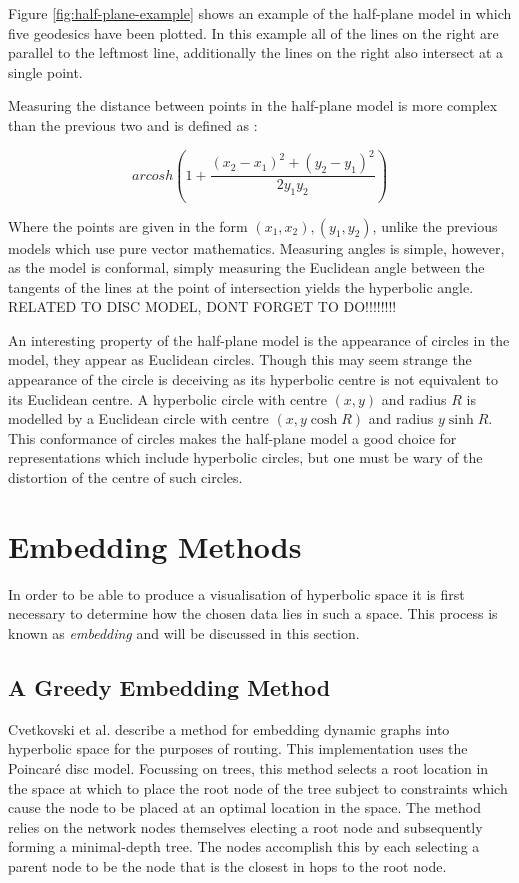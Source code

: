 Figure \ref{fig:half-plane-example} shows an example of the half-plane model in which five geodesics have been plotted. In this example all of the lines on the right are parallel to the leftmost line, additionally the lines on the right also intersect at a single point.

Measuring the distance between points in the half-plane model is more complex than the previous two and is defined as \cite{kubo_geometry_1988}:

\begin{equation}
\label{half_plane_distance}
arcosh\left(1+\frac{(x_2-x_1)^2+(y_2-y_1)^2}{2y_1y_2}\right)
\end{equation}

Where the points are given in the form $(x_1, x_2), (y_1, y_2)$, unlike the previous models which use pure vector mathematics. Measuring angles is simple, however, as the model is conformal, simply measuring the Euclidean angle between the tangents of the lines at the point of intersection yields the hyperbolic angle. RELATED TO DISC MODEL, DONT FORGET TO DO!!!!!!!!

An interesting property of the half-plane model is the appearance of circles in the model, they appear as Euclidean circles. Though this may seem strange the appearance of the circle is deceiving as its hyperbolic centre is not equivalent to its Euclidean centre. A hyperbolic circle with centre $(x,y)$ and radius $R$ is modelled by a Euclidean circle with centre $(x, y \cosh R)$ and radius $y \sinh R$. This conformance of circles makes the half-plane model a good choice for representations which include hyperbolic circles, but one must be wary of the distortion of the centre of such circles.

\section{Embedding Methods}
In order to be able to produce a visualisation of hyperbolic space it is first necessary to determine how the chosen data lies in such a space. This process is known as \textit{embedding} and will be discussed in this section.

\subsection{A Greedy Embedding Method}

Cvetkovski et al. \cite{cvetkovski_hyperbolic_2009} describe a method for embedding dynamic graphs into hyperbolic space for the purposes of routing. This implementation uses the Poincar\'{e} disc model. Focussing on trees, this method selects a root location in the space at which to place the root node of the tree subject to constraints which cause the node to be placed at an optimal location in the space. The method relies on the network nodes themselves electing a root node and subsequently forming a minimal-depth tree. The nodes accomplish this by each selecting a parent node to be the node that is the closest in hops to the root node. 

